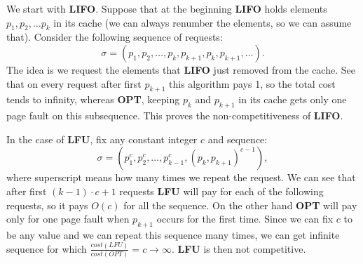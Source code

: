 We start with \textbf{LIFO}. Suppose that at the beginning \textbf{LIFO} holds
elements $p_1, p_2, \ldots p_k$ in its cache (we can always renumber the 
elements, so we can 
assume that). Consider the following sequence of requests:
$$ \sigma = (p_1, p_2, \ldots, p_k, p_{k+1}, p_k, p_{k+1}, \ldots).$$
The idea is we request the elements that \textbf{LIFO} just removed from the 
cache. See that on every request after first $p_{k+1}$ this algorithm pays 1, 
so the total cost tends to infinity, whereas \textbf{OPT}, keeping $p_k$ 
and $p_{k+1}$ in its cache gets only one page fault on this subsequence. 
This proves the non-competitiveness of \textbf{LIFO}.

In the case of \textbf{LFU}, fix any constant integer $c$ and sequence:
$$\sigma = (p_1^c, p_2^c, \ldots, p_{k-1}^c, (p_k, p_{k+1})^{c-1}),$$
where superscript means how many times we repeat the request. We can see that 
after first $(k-1) \cdot c + 1$ requests \textbf{LFU} will pay for each of the 
following requests, so it pays $O(c)$ for all the sequence. On the other hand 
\textbf{OPT} will pay only for one page fault when $p_{k+1}$ occurs for the 
first time. Since we can fix $c$ to be any value and we can repeat this 
sequence many times, we can get infinite sequence for which 
$\frac{cost(LFU)}{cost(OPT)} = c \rightarrow \infty$. 
\textbf{LFU} is then not competitive.
